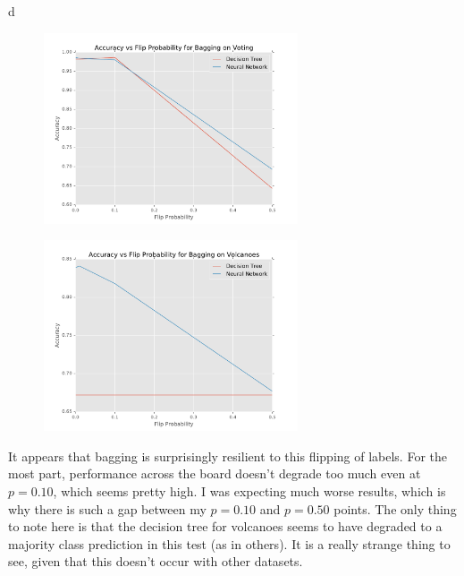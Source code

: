 \documentclass[fleqn]{homework}
\begin{document}
\begin{problem}{d}
    \begin{figure}[h!]
      \centering
      \caption{}
      \label{f:d-voting}
      \includegraphics[width=0.67\textwidth]{d-voting.pdf}
    \end{figure}
    \begin{figure}[h!]
      \centering
      \caption{}
      \label{f:d-volcanoes}
      \includegraphics[width=0.67\textwidth]{d-volcanoes.pdf}
    \end{figure}

    It appears that bagging is surprisingly resilient to this flipping of
    labels.  For the most part, performance across the board doesn't degrade too
    much even at $p=0.10$, which seems pretty high.  I was expecting much worse
    results, which is why there is such a gap between my $p=0.10$ and $p=0.50$
    points.  The only thing to note here is that the decision tree for volcanoes
    seems to have degraded to a majority class prediction in this test (as in
    others).  It is a really strange thing to see, given that this doesn't occur
    with other datasets.
  \end{problem}
\end{document}
